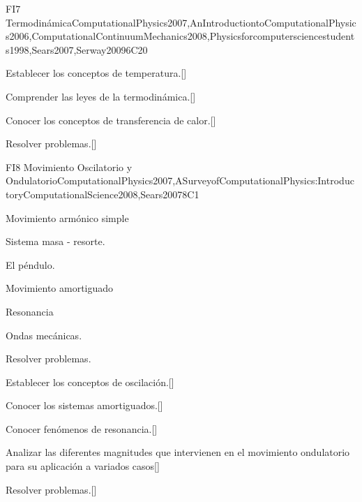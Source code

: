 \begin{syllabus}
\begin{unit}{}{FI7 Termodinámica}{ComputationalPhysics2007,AnIntroductiontoComputationalPhysics2006,ComputationalContinuumMechanics2008,Physicsforcomputersciencestudents1998,Sears2007,Serway2009}{6}{C20}
   \begin{learningoutcomes}
      \item Establecer los conceptos de temperatura.[\Usage]
      \item Comprender las leyes de la termodinámica.[\Usage]
      \item Conocer los conceptos de transferencia de calor.[\Usage]
      \item Resolver problemas.[\Usage]
   \end{learningoutcomes}
\end{unit}

\begin{unit}{}{FI8 Movimiento Oscilatorio y Ondulatorio}{ComputationalPhysics2007,ASurveyofComputationalPhysics:IntroductoryComputationalScience2008,Sears2007}{8}{C1}
\begin{topics}
      \item Movimiento armónico simple
      \item Sistema masa - resorte.
      \item El péndulo.
      \item Movimiento amortiguado
      \item Resonancia
      \item Ondas mecánicas.
      \item Resolver problemas.
  \end{topics}

   \begin{learningoutcomes}
      \item Establecer los conceptos de oscilación.[\Usage]
      \item Conocer los sistemas amortiguados.[\Usage]
      \item Conocer fenómenos de resonancia.[\Usage]
      \item Analizar las diferentes magnitudes que intervienen en el movimiento ondulatorio para su aplicación a variados casos[\Usage]
      \item Resolver problemas.[\Usage]
   \end{learningoutcomes}
\end{unit}



\begin{coursebibliography}
\end{coursebibliography}

\end{syllabus}
